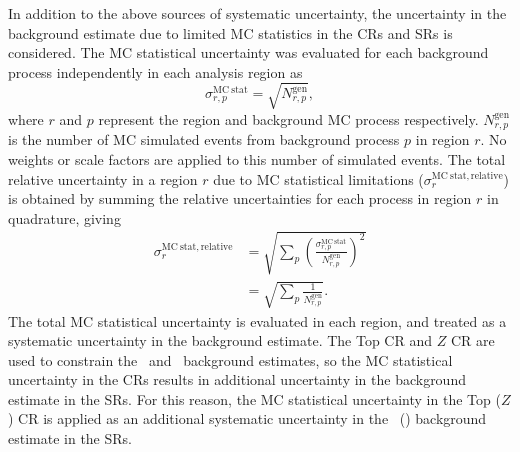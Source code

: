 In addition to the above sources of systematic uncertainty, the uncertainty
in the background estimate due to limited MC statistics in the CRs and SRs is
considered.
The MC statistical uncertainty was evaluated for each background process
independently in each analysis region as
\begin{equation}
  \sigma_{r,p}^\mathrm{MC~stat}
  =
  \sqrt{N_{r,p}^\mathrm{gen}},
\end{equation}
where $r$ and $p$ represent the region and background MC process respectively.
$N_{r,p}^\mathrm{gen}$ is the number of MC simulated events from background
process $p$ in region $r$.
No weights or scale factors are applied to this number of simulated events.
The total relative uncertainty in a region $r$ due to MC statistical
limitations ($\sigma_{r}^\mathrm{MC~stat,relative}$) is obtained by summing the
relative uncertainties for each process in region $r$ in quadrature, giving
\begin{equation}
  \begin{aligned}
  \sigma_{r}^\mathrm{MC~stat,relative}
  & =
  \sqrt{ \sum_{p} \left(\frac{\sigma_{r,p}^\mathrm{MC~stat}}{N_{r,p}^\mathrm{gen}}\right)^2 }
  \\
  & =
  \sqrt{ \sum_{p} \frac{1}{N_{r,p}^\mathrm{gen}} }.
  \end{aligned}
\end{equation}
The total MC statistical uncertainty is evaluated in each region, and treated
as a systematic uncertainty in the background estimate.
The Top CR and $Z$ CR are used to constrain the \TTBAR\ and
\ZGAMMAJETS\ background estimates, so the MC statistical uncertainty in the
CRs results in additional uncertainty in the background estimate in the SRs.
For this reason, the MC statistical uncertainty in the Top ($Z$) CR is applied
as an additional systematic uncertainty in the \TTBAR\ (\ZGAMMAJETS) background
estimate in the SRs.

